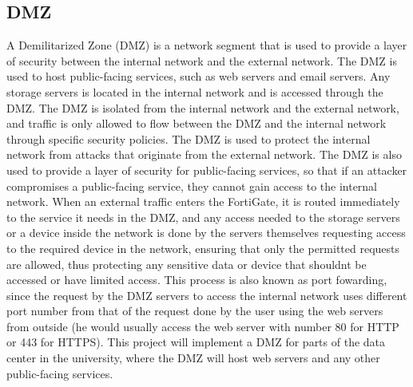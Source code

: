 \documentclass[12pt]{report}
\begin{document}
\subsection{DMZ}
A Demilitarized Zone (DMZ) is a network segment that is used to provide a layer of security between the internal network and the external network. The DMZ is used to host public-facing services, such as web servers and email servers. Any storage servers is located in the internal network and is accessed through the DMZ. The DMZ is isolated from the internal network and the external network, and traffic is only allowed to flow between the DMZ and the internal network through specific security policies. The DMZ is used to protect the internal network from attacks that originate from the external network. The DMZ is also used to provide a layer of security for public-facing services, so that if an attacker compromises a public-facing service, they cannot gain access to the internal network. When an external traffic enters the FortiGate, it is routed immediately to the service it needs in the DMZ, and any access needed to the storage servers or a device inside the network is done by the servers themselves requesting access to the required device in the network, ensuring that only the permitted requests are allowed, thus protecting any sensitive data or device that shouldnt be accessed or have limited access. This process is also known as port fowarding, since the request by the DMZ servers to access the internal network uses different port number from that of the request done by the user using the web servers from outside (he would usually access the web server with number 80 for HTTP or 443 for HTTPS). This project will implement a DMZ for parts of the data center in the university, where the DMZ will host web servers and any other public-facing services. %
\end{document}
